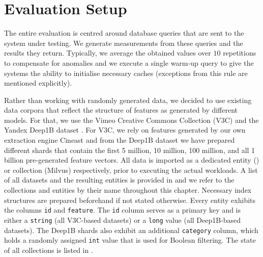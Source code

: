 \section{Evaluation Setup}

The entire evaluation is centred around database queries that are sent to the system under testing. We generate measurements from these queries and the results they return. Typically, we average the obtained values over $10$ repetitions to compensate for anomalies and we execute a single warm-up query to give the systems the ability to initialise necessary caches (exceptions from this rule are mentioned explicitly). 

Rather than working with randomly generated data, we decided to use existing data corpora that reflect the structure of features as generated by different models. For that, we use the Vimeo Creative Commons Collection (V3C) \cite{Berns:2019V3C1,Rossetto:2021Insights} and the Yandex Deep1B dataset \cite{Babenko:2016Efficient}. For V3C, we rely on features generated by our own extraction engine Cineast \cite{Rossetto:2016Vitrivr} and from the Deep1B dataset we have prepared different shards that contain the first 5 million, 10 million, 100 million, and all 1 billion pre-generated feature vectors. All data is imported as a dedicated entity (\cottontail{}) or collection (Milvus) respectively, prior to executing the actual workloads. A list of all datasets and the resulting entities is provided in  and we refer to the collections and entities by their name throughout this chapter.
Necessary index structures are prepared beforehand if not stated otherwise. Every entity exhibits the columns \texttt{id} and \texttt{feature}. The \texttt{id} column serves as a primary key and is either a \texttt{string} (all V3C-based datasets) or a \texttt{long} value (all Deep1B-based datasets). The Deep1B shards also exhibit an additional \texttt{category} column, which holds a randomly assigned \texttt{int} value that is used for Boolean filtering. The state of all collections is listed in .

